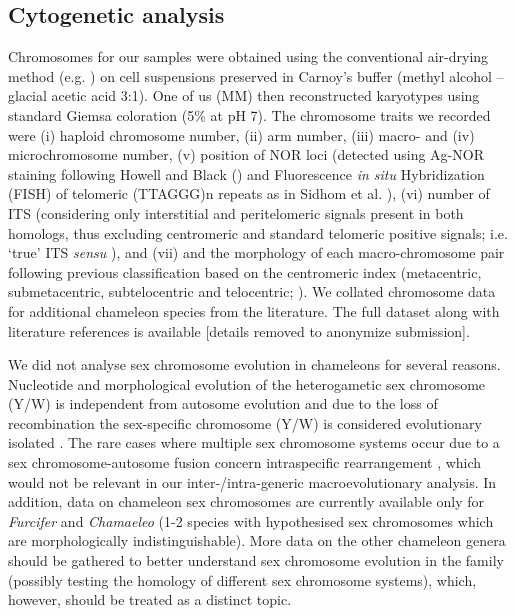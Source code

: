 \documentclass[a4paper, 12pt]{article}
\begin{document}
\subsection{Cytogenetic analysis}
Chromosomes for our samples were obtained using the conventional air-drying method (e.g. \citealt{sidhom2020karyological}) on cell suspensions preserved in Carnoy’s buffer (methyl alcohol – glacial acetic acid 3:1). 
One of us (MM) then reconstructed karyotypes using standard Giemsa coloration (5\% at pH 7). 
The chromosome traits we recorded were (i) haploid chromosome number, (ii) arm number, (iii) macro- and (iv) microchromosome number, (v) position of NOR loci (detected using Ag-NOR staining following Howell and Black (\citeyear{howell1980controlled}) and Fluorescence \textit{in situ} Hybridization (FISH) of telomeric (TTAGGG)n repeats as in Sidhom et al. \citeyear{sidhom2020karyological}), (vi) number of ITS (considering only interstitial and peritelomeric signals present in both homologs, thus excluding centromeric and standard telomeric positive signals; i.e. `true' ITS \textit{sensu} \citealt{bolzan2012chromosomal,chirino2017chromosomal}), and (vii) and the morphology of each macro-chromosome pair following previous classification based on the centromeric index (metacentric, submetacentric, subtelocentric and telocentric; \citealt{levan1964nomenclature}). 
We collated chromosome data for additional chameleon species from the literature. 
The full dataset along with literature references is available [details removed to anonymize submission].

We did not analyse sex chromosome evolution in chameleons for several reasons. 
Nucleotide and morphological evolution of the heterogametic sex chromosome (Y/W) is independent from autosome evolution and due to the loss of recombination the sex-specific chromosome (Y/W) is considered evolutionary isolated \citep[see e.g.][]{ezaz2014repetitive,mezzasalma2021lizards}. 
The rare cases where multiple sex chromosome systems occur due to a sex chromosome-autosome fusion concern intraspecific rearrangement \citep[as in the case of the neo-sex chromosomes in \textit{Furcifer} reported by][]{rovatsos2015female,rovatsos2017evolution,rovatsos2019zz}, which would not be relevant in our inter-/intra-generic macroevolutionary analysis. 
In addition, data on chameleon sex chromosomes are currently available only for \textit{Furcifer} \citep{rovatsos2015female,rovatsos2017evolution,rovatsos2019zz} and \textit{Chamaeleo} \citep{sidhom2020karyological,tishakova2022identification} (1-2 species with hypothesised sex chromosomes which are morphologically indistinguishable). 
More data on the other chameleon genera should be gathered to better understand sex chromosome evolution in the family (possibly testing the homology of different sex chromosome systems), which, however, should be treated as a distinct topic.
\end{document}
